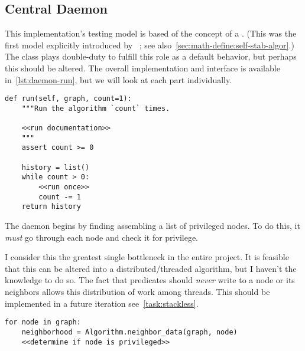 \subsection{Central Daemon}
\label{sec:logic-repr:daemon}

This implementation's testing model is based of the concept of a .
(This was the first model explicitly introduced
  by \citeauthor{dew:sem}~\autocite{dew:sem}; see also~\autoref{sec:math-define:self-stab-algor}.)
The  class plays double-duty to fulfill this role as a default behavior,
  but perhaps this should be altered.
The overall implementation and interface is available in~\autoref{lst:daemon-run},
  but we will look at each part individually.

\begin{lstlisting}[float=p, caption={A generalized run of a self-stabilizing algorithm.}, label={lst:daemon-run}]
def run(self, graph, count=1):
    """Run the algorithm `count` times.

    <<run documentation>>
    """
    assert count >= 0

    history = list()
    while count > 0:
        <<run once>>
        count -= 1
    return history
\end{lstlisting}

The daemon begins by finding assembling a list of privileged nodes.
To do this, it \emph{must} go through each node and check it for privilege.
\begin{warning}
  I consider this the greatest single bottleneck in the entire project.
  It is feasible that this can be altered into a distributed\slash threaded algorithm,
    but I haven't the knowledge to do so.
  The fact that predicates should \emph{never} write to a node or its neighbors
    allows this distribution of work among threads.
  This should be implemented in a future iteration \Dash see~\autoref{task:stackless}.
\end{warning}

\begin{lstlisting}[float=p, caption={Finding privileged nodes.}, label={lst:daemon-find-privileged-nodes}]
for node in graph:
    neighborhood = Algorithm.neighbor_data(graph, node)
    <<determine if node is privileged>>
\end{lstlisting}

